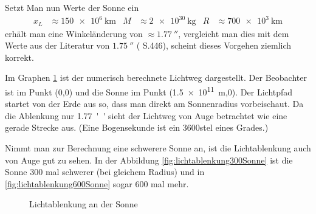 \begin{refsection}
\begin{beispiel}
  Setzt Man nun Werte der Sonne ein
  \begin{align*}
    x_L &\approx \SI{150e6}{\kilo\meter} &M &\approx
                                              \SI{2e30}{\kilogram}
    &R &\approx \SI{700e3}{\kilo\meter}
  \end{align*}
  erhält man eine Winkeländerung von \(\approx \SI{1.77}{''}\),
  vergleicht man dies mit dem Werte aus der Literatur von
  \(\SI{1.75}{''}\) (\cite{misner1973gravitation} S.446), scheint
  dieses Vorgehen ziemlich korrekt.

  Im Graphen \ref{fig:lichtablenkungSonne} ist der numerisch
  berechnete Lichtweg dargestellt.  Der Beobachter ist im Punkt (0,0)
  und die Sonne im Punkt (\SI{1.5e11}{\meter},0).  Der Lichtpfad
  startet von der Erde aus so, dass man direkt am Sonnenradius
  vorbeischaut.  Da die Ablenkung nur \SI{1.77}{''} sieht der Lichtweg
  von Auge betrachtet wie eine gerade Strecke aus.  (Eine Bogensekunde
  ist ein 3600stel eines Grades.)

  Nimmt man zur Berechnung eine schwerere Sonne an, ist die
  Lichtablenkung auch von Auge gut zu sehen.  In der Abbildung
  \ref{fig:lichtablenkung300Sonne} ist die Sonne 300 mal schwerer (bei
  gleichem Radius) und in \ref{fig:lichtablenkung600Sonne} sogar 600
  mal mehr.

  \begin{figure}
    \centering
    \caption{Lichtablenkung an der Sonne}
    \label{fig:lichtablenkungSonne}
  \end{figure}
  

\end{beispiel}
\end{refsection}
